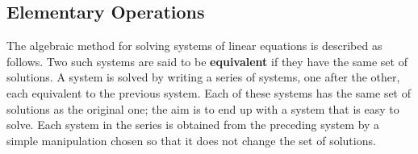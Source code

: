 \subsection*{Elementary Operations}

The algebraic method for solving systems of linear equations is described as follows. Two such systems are said to be \textbf{equivalent} if they have the same set of solutions. A system is solved by writing a series of systems, one after the other, each equivalent to the previous system. Each of these systems has the same set of solutions as the original one; the aim is to end up with a system that is easy to solve. Each system in the series is obtained from the preceding system by a simple manipulation chosen so that it does not change the set of solutions.

